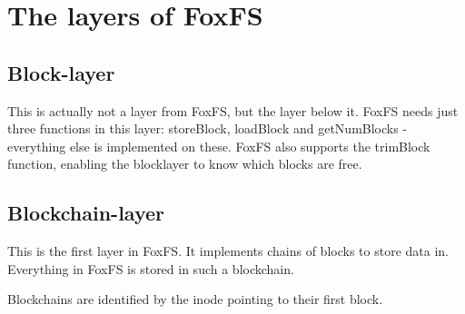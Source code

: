 \documentclass[a4paper,12pt]{article}
\begin{document}
	\section{The layers of FoxFS}
		\subsection{Block-layer}
			This is actually not a layer from FoxFS, but the layer below it. FoxFS needs just three functions in this layer: storeBlock, loadBlock and getNumBlocks - everything else is implemented on these. FoxFS also supports the trimBlock function, enabling the blocklayer to know which blocks are free.
		\subsection{Blockchain-layer}
			This is the first layer in FoxFS. It implements chains of blocks to store data in. Everything in FoxFS is stored in such a blockchain.
			
			Blockchains are identified by the inode pointing to their first block.
	
\end{document}

